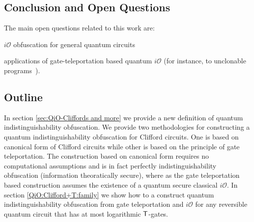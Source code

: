\subsection{Conclusion and Open Questions}

The main open questions related to this work are:

$i\mathcal{O}$ obfuscation for general quantum circuits

applications of gate-teleportation based quantum $i\mathcal{O}$ (for instance, to unclonable programs~\cite{Aar09}).


\subsection*{Outline}
In section \ref{sec:QiO-Cliffords and more} we provide a new definition of quantum indistinguishability obfuscation. We provide two methodologies for constructing a quantum indistinguishability obfuscation for Clifford circuits. One is based on canonical form of Clifford circuits  while other is based on the principle of gate teleportation.  The construction based on canonical form requires no computational assumptions and is in fact perfectly indistinguishability obfuscation (information theoratically secure), where as the gate teleportation based construction assumes the existence of a quantum secure classical $i\mathcal{O}.$ In section \ref{QiO:Clifford+T:family} we show how to a construct quantum indistinguishability obfuscation from gate teleportation and $i\mathcal{O}$ for any reversible quantum circuit that has at most logarithmic ${\sf T}$-gates.

